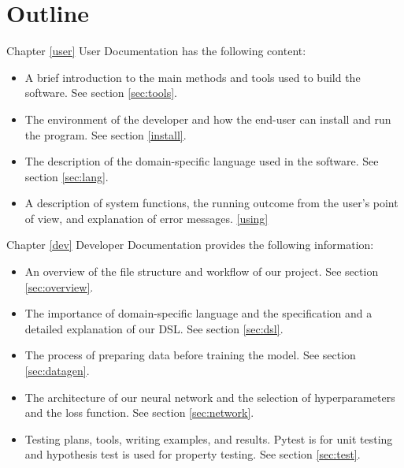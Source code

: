 \section{Outline}
Chapter \ref{user} User Documentation has the following content: 
\begin{itemize}
	\item A brief introduction to the main methods and tools used to build the software. See section \ref{sec:tools}.
	
	\item The environment of the developer and how the end-user can install and run the program. See section \ref{install}.
	
	\item The description of the domain-specific language used in the software. See section \ref{sec:lang}.
	
	\item A description of system functions, the running outcome from the user's point of view, and explanation of error messages. \ref{using}
\end{itemize}

\noindent Chapter \ref{dev} Developer Documentation provides the following information: 
\begin{itemize}
	\item An overview of the file structure and workflow of our project. See section \ref{sec:overview}.
	
	\item The importance of domain-specific language and the specification and a detailed explanation of our DSL. See section \ref{sec:dsl}.
	
	\item The process of preparing data before training the model. See section \ref{sec:datagen}.
	
	\item The architecture of our neural network and the selection of hyperparameters and the loss function. See section \ref{sec:network}.
	
	\item Testing plans, tools, writing examples, and results. Pytest \cite{pytest} is for unit testing and hypothesis test \cite{hytest} is used for property testing. See section \ref{sec:test}.
\end{itemize}